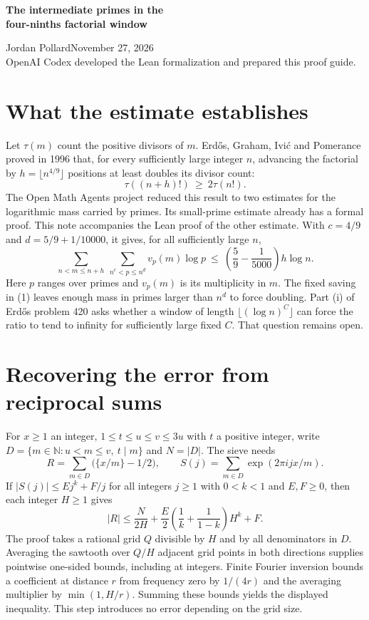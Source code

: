 \documentclass[10pt]{article}
\begin{document}
{\LARGE\bfseries The intermediate primes in the\\[2pt] four-ninths factorial window}\par\medskip
Jordan Pollard\hfill November 27, 2026\\
{\small OpenAI Codex developed the Lean formalization and prepared this proof guide.}

\section*{What the estimate establishes}
Let $\tau(m)$ count the positive divisors of $m$. Erd\H{o}s, Graham, Ivi\'c and Pomerance proved in 1996 that, for every sufficiently large integer $n$, advancing the factorial by $h=\lfloor n^{4/9}\rfloor$ positions at least doubles its divisor count:
\[
                         \tau((n+h)!)\ \ge\ 2\tau(n!).
\]
The Open Math Agents project reduced this result to two estimates for the logarithmic mass carried by primes. Its small-prime estimate already has a formal proof. This note accompanies the Lean proof of the other estimate. With $c=4/9$ and $d=5/9+1/10000$, it gives, for all sufficiently large $n$,
\begin{equation}
 \sum_{n<m\le n+h}\ \sum_{n^c<p\le n^d} v_p(m)\log p
 \ \le\ \left(\frac59-\frac1{5000}\right)h\log n .
 \tag{1}
\end{equation}
Here $p$ ranges over primes and $v_p(m)$ is its multiplicity in $m$. The fixed saving in (1) leaves enough mass in primes larger than $n^d$ to force doubling. Part (i) of Erd\H{o}s problem 420 asks whether a window of length $\lfloor(\log n)^C\rfloor$ can force the ratio to tend to infinity for sufficiently large fixed $C$. That question remains open.

\section*{Recovering the error from reciprocal sums}
For $x\ge1$ an integer, $1\le t\le u\le v\le3u$ with $t$ a positive integer, write $D=\{m\in\mathbb N:u<m\le v,\ t\mid m\}$ and $N=|D|$. The sieve needs
\[
 R=\sum_{m\in D}\big(\{x/m\}-1/2\big),\qquad
 S(j)=\sum_{m\in D}\exp(2\pi i jx/m).
\]
If $|S(j)|\le E j^k+F/j$ for all integers $j\ge1$ with $0<k<1$ and $E,F\ge0$, then each integer $H\ge1$ gives
\[
 |R|\le \frac{N}{2H}+\frac E2\left(\frac1k+\frac1{1-k}\right)H^k+F.
\]
The proof takes a rational grid $Q$ divisible by $H$ and by all denominators in $D$. Averaging the sawtooth over $Q/H$ adjacent grid points in both directions supplies pointwise one-sided bounds, including at integers. Finite Fourier inversion bounds a coefficient at distance $r$ from frequency zero by $1/(4r)$ and the averaging multiplier by $\min(1,H/r)$. Summing these bounds yields the displayed inequality. This step introduces no error depending on the grid size.
\end{document}
